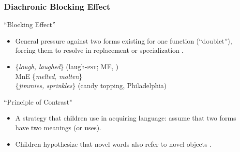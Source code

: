 \documentclass[hyperref={pdfpagelabels=false}]{beamer}
\begin{document}
\begin{frame}
\frametitle{Diachronic Blocking Effect}
\begin{block}{``Blocking Effect'' \citep{aronoff1976}}
	\begin{itemize}
		\item General pressure against two forms existing for one function (``doublet''), forcing them to resolve in replacement or specialization \citep{kroch1994}.
		\item[ ]\{\textsl{lough, laughed}\} (laugh-\textsc{pst}; ME, \citealt{taylor1994})\\ MnE \{\textsl{melted, molten}\}\\ \{\textsl{jimmies, sprinkles}\} (candy topping, Philadelphia)
	\end{itemize}
\end{block}
\begin{block}{``Principle of Contrast''}
	\begin{itemize}
		\item A strategy that children use in acquiring language: assume that two forms have two meanings (or uses)\citep[][{ \it inter alia}]{clark1987, clark1990}.
		\item Children hypothesize that novel words also refer to novel objects \citep[as in][among many other replications of the effect]{markmanwachtel1988}.
	\end{itemize}
\end{block}
\end{frame}
\end{document}
